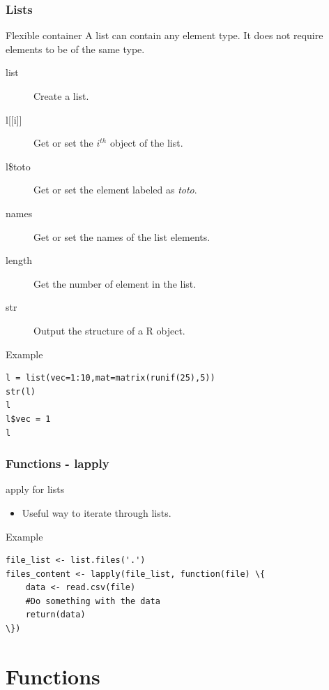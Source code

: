 \documentclass[10pt]{beamer}
\newenvironment{xframe}[2][]
  {\begin{frame}[fragile,environment=xframe,#1]
  \frametitle{#2}}
  {\end{frame}}
\begin{document}
\begin{xframe}{Lists}
  \begin{block}{Flexible container}
    A {\sf list} can contain any element type. It does not require elements to be of
    the same type.
    \begin{description}
      \item[list] Create a {\sf list}.
      \item[{l[[i]]} ] Get or set the $i^{th}$ object of the {\sf list}.
      \item[l\$toto] Get or set the element labeled as {\it toto}.
      \item[names] Get or set the names of the {\sf list} elements.
      \item[length] Get the number of element in the {\sf list}.
      \item[str] Output the structure of a R object.
    \end{description}
  \end{block}
  \begin{exampleblock}{Example}
\begin{verbatim}
l = list(vec=1:10,mat=matrix(runif(25),5))
str(l)
l
l$vec = 1
l
\end{verbatim}
  \end{exampleblock}
\end{xframe}


\begin{xframe}{Functions - {\sf lapply}}
  \begin{block}{apply for {\sf list}s}
    \begin{itemize}
    \item Useful way to iterate through {\sf list}s.
    \end{itemize}
  \end{block}
  \begin{exampleblock}{Example}
\begin{verbatim}
file_list <- list.files('.')
files_content <- lapply(file_list, function(file) \{
	data <- read.csv(file)
	#Do something with the data
	return(data)
\})
\end{verbatim}  
  \end{exampleblock}
\end{xframe}


\section{Functions}
\end{document}
